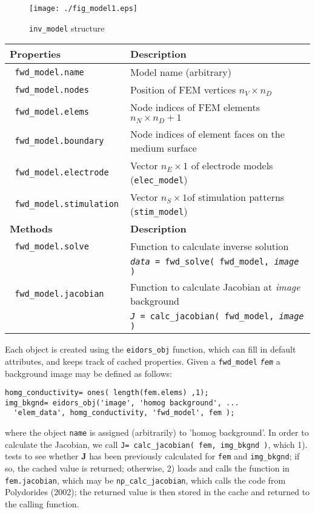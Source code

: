 \documentclass[12pt]{iopart}
\begin{document}
%
%
\begin{figure}[th]
\begin{flushright}
\texttt{[image: ./fig\_model1.eps]}
\caption{\small {\tt inv\_model} structure
 }
\end{flushright}
\end{figure}

\begin{tabular}{ll}
{\bf Properties} & {\bf Description } \\
\hline
{\tt
        fwd\_model.name
} &
        Model name (arbitrary)
\\
{\tt
        fwd\_model.nodes
} &
        Position of FEM vertices
        $n_V{\times}n_D$
\\
{\tt
        fwd\_model.elems
} &
        Node indices of FEM elements
        $n_N{\times}n_D+1$
\\
{\tt
        fwd\_model.boundary
} &
        Node indices of element faces on the medium surface
\\
{\tt
        fwd\_model.electrode
} &
        Vector $n_E{\times}1$
           of electrode models ({\tt elec\_model})
\\
{\tt
        fwd\_model.stimulation
} &
         Vector $n_S{\times}1$of stimulation
            patterns ({\tt stim\_model})
\\
\hline
{\bf Methods} & {\bf Description } \\
\hline
{\tt
        fwd\_model.solve
} &
        Function to calculate inverse solution
\\ &
        {\tt {\em data} = fwd\_solve( fwd\_model, {\em image} )}
\\
{\tt
        fwd\_model.jacobian
} &
        Function to calculate Jacobian at {\em image} background
\\ &
        {\tt {\em J} = calc\_jacobian( fwd\_model, {\em image} )}
\\
\end{tabular}


Each object is created using the {\tt eidors\_obj}
function, which can fill in default attributes, and 
keeps track of cached properties.
Given a {\tt fwd\_model} {\tt\em fem}
a background image may be defined as follows:
\begin{verbatim}
homg_conductivity= ones( length(fem.elems) ,1);
img_bkgnd= eidors_obj('image', 'homog background', ...
  'elem_data', homg_conductivity, 'fwd_model', fem );
\end{verbatim}
where the object {\tt name} is assigned
(arbitrarily) to 'homog background'.
In order to calculate the Jacobian, we call
{\tt J= calc\_jacobian( fem, img\_bkgnd )}, which
1). tests to see whether {\bf J} has been previously
calculated for {\tt fem} and {\tt img\_bkgnd}; if
so, the cached value is returned; otherwise,
2) loads and calls the function in {\tt fem.jacobian},
which may be {\tt np\_calc\_jacobian}, which 
calls the code from Polydorides (2002); the returned
value is then stored in the cache and returned to the
calling function.
\end{document}
